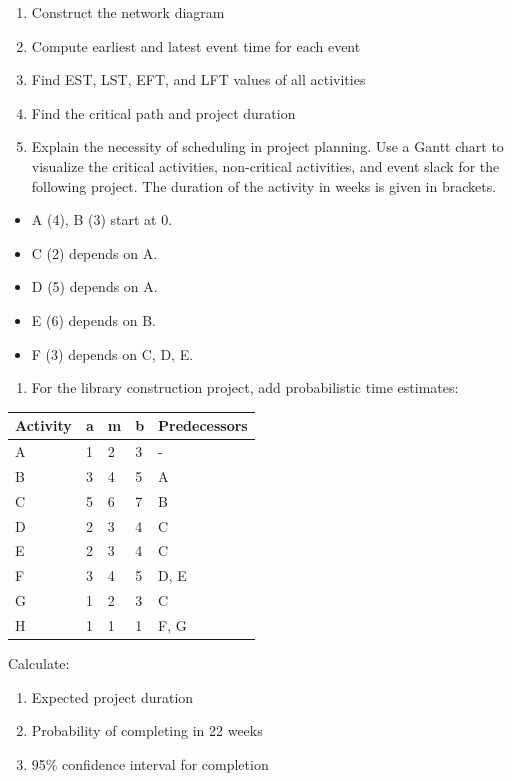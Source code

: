 \documentclass[
  letterpaper,
  DIV=11,
  numbers=noendperiod]{scrreprt}
\providecommand{\tightlist}{%
  \setlength{\itemsep}{0pt}\setlength{\parskip}{0pt}}
\begin{document}
\begin{enumerate}
\def\labelenumi{\arabic{enumi}.}
\item
  Construct the network diagram
\item
  Compute earliest and latest event time for each event
\item
  Find EST, LST, EFT, and LFT values of all activities
\item
  Find the critical path and project duration
\item
  Explain the necessity of scheduling in project planning. Use a Gantt
  chart to visualize the critical activities, non-critical activities,
  and event slack for the following project. The duration of the
  activity in weeks is given in brackets.
\end{enumerate}

\begin{itemize}
\tightlist
\item
  A (4), B (3) start at 0.
\item
  C (2) depends on A.
\item
  D (5) depends on A.
\item
  E (6) depends on B.
\item
  F (3) depends on C, D, E.
\end{itemize}

\begin{enumerate}
\def\labelenumi{\arabic{enumi}.}
\setcounter{enumi}{8}
\tightlist
\item
  For the library construction project, add probabilistic time
  estimates:
\end{enumerate}

\begin{longtable}[]{@{}lllll@{}}
\toprule\noalign{}
Activity & a & m & b & Predecessors \\
\midrule\noalign{}
\endhead
\bottomrule\noalign{}
\endlastfoot
A & 1 & 2 & 3 & - \\
B & 3 & 4 & 5 & A \\
C & 5 & 6 & 7 & B \\
D & 2 & 3 & 4 & C \\
E & 2 & 3 & 4 & C \\
F & 3 & 4 & 5 & D, E \\
G & 1 & 2 & 3 & C \\
H & 1 & 1 & 1 & F, G \\
\end{longtable}

Calculate:

\begin{enumerate}
\def\labelenumi{\arabic{enumi}.}
\tightlist
\item
  Expected project duration
\item
  Probability of completing in 22 weeks
\item
  95\% confidence interval for completion
\end{enumerate}
\end{document}
